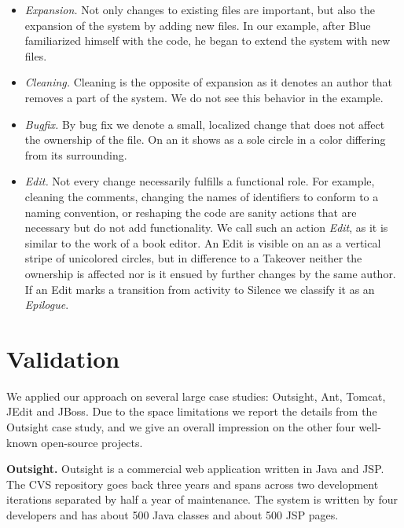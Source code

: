 \begin{itemize}
\item \emph{Expansion.} Not only changes to existing files are important, but also the expansion of the system by adding new files. In our example, after Blue familiarized himself with the code, he began to extend the system with new files.

\item \emph{Cleaning.} Cleaning is the opposite of expansion as it denotes an author that removes a part of the system. We do not see this behavior in the example.

\item \emph{Bugfix.} By bug fix we denote a small, localized change that does not affect the ownership of the file. On an \omap it shows as a sole circle in a color differing from its surrounding.

\item \emph{Edit.} Not every change necessarily fulfills a functional role. For example, cleaning the comments, changing the names of identifiers to conform to a naming convention, or reshaping the code are sanity actions that are necessary but do not add functionality. We call such an action \emph{Edit}, as it is similar to the work of a book editor. An Edit is visible on an \omap as a vertical stripe of unicolored circles, but in difference to a Takeover neither the ownership is affected nor is it ensued by further changes by the same author. If an Edit marks a transition from activity to Silence we classify it as an \emph{Epilogue}.

\end{itemize}

\section{Validation}\label{sec:validation}

We applied our approach on several large case studies: Outsight, Ant, Tomcat, JEdit and JBoss. Due to the space limitations we report the details from the Outsight case study, and we give an overall impression on the other four well-known open-source projects.

\textbf{Outsight.} Outsight is a commercial web application written in Java and JSP. The CVS repository goes back three years and spans across two development iterations separated by half a year of maintenance. The system is written by four developers and has about 500 Java classes and about 500 JSP pages.


